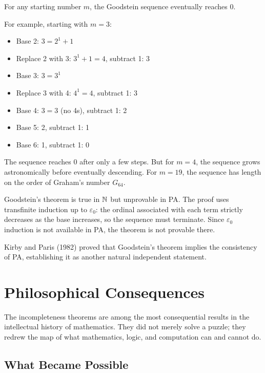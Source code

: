\begin{theorem}
For any starting number $m$, the Goodstein sequence eventually reaches 0.
\end{theorem}

For example, starting with $m = 3$:
\begin{itemize}
\item Base 2: $3 = 2^1 + 1$
\item Replace 2 with 3: $3^1 + 1 = 4$, subtract 1: 3
\item Base 3: $3 = 3^1$
\item Replace 3 with 4: $4^1 = 4$, subtract 1: 3
\item Base 4: $3 = 3$ (no 4s), subtract 1: 2
\item Base 5: 2, subtract 1: 1
\item Base 6: 1, subtract 1: 0
\end{itemize}

The sequence reaches 0 after only a few steps. But for $m = 4$, the sequence grows astronomically before eventually descending. For $m = 19$, the sequence has length on the order of Graham's number $G_{64}$.

Goodstein's theorem is true in $\mathbb{N}$ but unprovable in PA. The proof uses transfinite induction up to $\varepsilon_0$: the ordinal associated with each term strictly decreases as the base increases, so the sequence must terminate. Since $\varepsilon_0$ induction is not available in PA, the theorem is not provable there.

Kirby and Paris (1982) proved that Goodstein's theorem implies the consistency of PA, establishing it as another natural independent statement.

\section{Philosophical Consequences}
\label{sec:godel:consequences}

The incompleteness theorems are among the most consequential results in the intellectual history of mathematics. They did not merely solve a puzzle; they redrew the map of what mathematics, logic, and computation can and cannot do.

\subsection{What Became Possible}
\label{sec:godel:became_possible}

